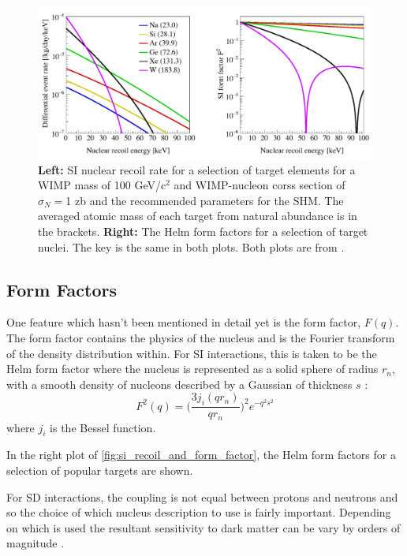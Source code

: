 \begin{figure}
    \centering
    \includegraphics[width=\textwidth]{Figures/LZ/SI_recoil_rate_and_spectra.png}
    \caption{\textbf{Left:} SI nuclear recoil rate for a selection of target elements for a WIMP mass of 100 GeV/c$^2$ and WIMP-nucleon corss section of $\sigma_N=$1 zb and the recommended parameters for the SHM. The averaged atomic mass of each target from natural abundance is in the brackets.
    \textbf{Right:} The Helm form factors for a selection of target nuclei. The key is the same in both plots.
    Both plots are from \cite{LZ_Ibles_LZStats_Thesis_ref}
    \label{fig:si_recoil_and_form_factor}.
           }
\end{figure}
 
\subsection{Form Factors}
\label{sec:form_factors}
\par
One feature which hasn't been mentioned in detail yet is the form factor, $F(q)$.
The form factor contains the physics of the nucleus and is the Fourier transform of the density distribution within.
For SI interactions, this is taken to be the Helm form factor where the nucleus is represented as a solid sphere of radius $r_n$, with a smooth density of nucleons described by a Gaussian of thickness $s$ \cite{helm_form_factor_ref}:
\begin{equation}
    F^2(q) = \bigg( \frac{3j_i(qr_n)}{qr_n} \bigg)^2 e^{-q^2 s^2}
\end{equation}
where $j_i$ is the Bessel function.
\par
In the right plot of \autoref{fig:si_recoil_and_form_factor}, the Helm form factors for a selection of popular targets are shown.

\par
For SD interactions, the coupling is not equal between protons and neutrons and so the choice of which nucleus description to use is fairly important.
Depending on which is used the resultant sensitivity to dark matter can be vary by orders of magnitude \cite{wimp_nuclear_model_ref,wimp_sd_form_factor_ref}.
